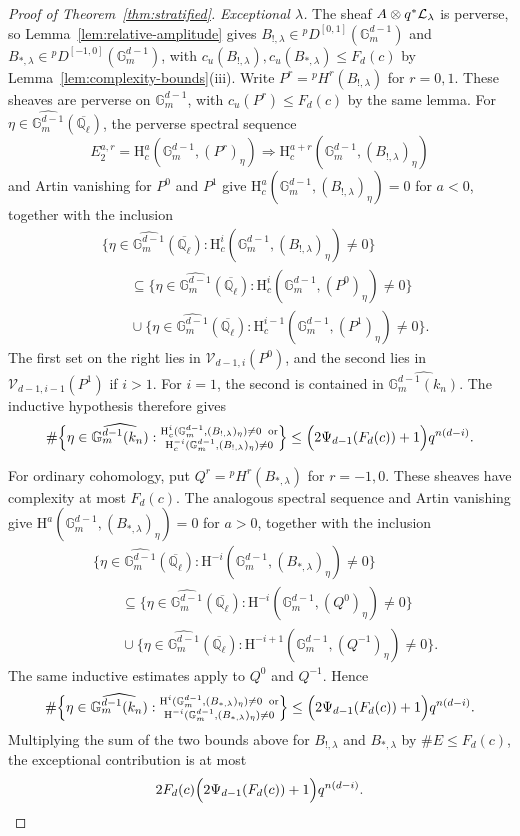 \documentclass[12pt,reqno]{amsart}
\theoremstyle{definition}
\theoremstyle{plain}
\theoremstyle{definition}
\theoremstyle{remark}
\newcommand{\bbG}{\mathbb{G}}  \newcommand{\bbH}{\mathbb{H}}
\newcommand{\bbQ}{\mathbb{Q}}  \newcommand{\bbR}{\mathbb{R}}
\newcommand{\HH}{\mathrm{H}}  \newcommand{\JJ}{\mathrm{J}}
\newcommand{\ol}[1]{\overline{#1}}
\newcommand{\Ql}{\bbQ_{\ell}}
\newcommand{\Gm}{\bbG_m}
\newcommand{\cu}{c_u}
\begin{document}
\begin{proof}[Proof of Theorem~\ref{thm:stratified}]
\emph{Exceptional \(\lambda\).}  The sheaf \(A\otimes q^*\mathcal{L}_\lambda\) is perverse, so
Lemma~\ref{lem:relative-amplitude} gives \(B_{!,\lambda}\in{}^pD^{[0,1]}(\Gm^{d-1})\) and
\(B_{*,\lambda}\in{}^pD^{[-1,0]}(\Gm^{d-1})\), with
\(\cu(B_{!,\lambda}),\cu(B_{*,\lambda})\le F_{d}(c)\) by Lemma~\ref{lem:complexity-bounds}(iii).  Write
\(P^r={}^pH^r(B_{!,\lambda})\) for \(r=0,1\).  These sheaves are perverse on \(\Gm^{d-1}\), with
\(\cu(P^r)\le F_{d}(c)\) by the same lemma.  For
\(\eta\in\widehat{\Gm^{d-1}}(\ol\Ql)\), the perverse spectral sequence
\[
 E_2^{a,r}=\HH^a_c(\Gm^{d-1},(P^r)_\eta)
 \Rightarrow\HH^{a+r}_c(\Gm^{d-1},(B_{!,\lambda})_\eta)
\]
and Artin vanishing for \(P^0\) and \(P^1\) give \(\HH^{a}_c(\Gm^{d-1},(B_{!,\lambda})_\eta)=0\) for
\(a<0\), together with the inclusion
\[
\begin{aligned}
 &\{\eta\in\widehat{\Gm^{d-1}}(\ol\Ql):
       \HH^{i}_c(\Gm^{d-1},(B_{!,\lambda})_\eta)\neq0\}\\
 &\qquad\subseteq
 \{\eta\in\widehat{\Gm^{d-1}}(\ol\Ql):\HH^{i}_c(\Gm^{d-1},(P^0)_\eta)\neq0\}\\
 &\qquad{}\cup
 \{\eta\in\widehat{\Gm^{d-1}}(\ol\Ql):\HH^{i-1}_c(\Gm^{d-1},(P^1)_\eta)\neq0\}.
\end{aligned}
\]
The first set on the right lies in
\(\mathcal V_{d-1,i}(P^0)\), and the second lies in \(\mathcal V_{d-1,i-1}(P^1)\) if \(i>1\).  For
\(i=1\), the second is contained in \(\widehat{\Gm^{d-1}(k_n)}\).  The inductive hypothesis therefore gives
\[
 \#\Bigl\{\eta\in\widehat{\Gm^{d-1}(k_n)}:
 \substack{\HH^i_c(\Gm^{d-1},(B_{!,\lambda})_\eta)\neq0\ \,\text{or}\\
           \HH^{-i}_c(\Gm^{d-1},(B_{!,\lambda})_\eta)\neq0}\Bigr\}
 \le\Bigl(2\Psi_{d-1}(F_{d}(c))+1\Bigr)q^{n(d-i)}.
\]

For ordinary cohomology, put \(Q^r={}^pH^r(B_{*,\lambda})\) for \(r=-1,0\).  These sheaves have complexity
at most \(F_{d}(c)\).  The analogous spectral sequence and Artin vanishing give
\(\HH^{a}(\Gm^{d-1},(B_{*,\lambda})_\eta)=0\) for \(a>0\), together with the inclusion
\[
\begin{aligned}
 &\{\eta\in\widehat{\Gm^{d-1}}(\ol\Ql):
       \HH^{-i}(\Gm^{d-1},(B_{*,\lambda})_\eta)\neq0\}\\
 &\qquad\subseteq
 \{\eta\in\widehat{\Gm^{d-1}}(\ol\Ql):\HH^{-i}(\Gm^{d-1},(Q^0)_\eta)\neq0\}\\
 &\qquad{}\cup
 \{\eta\in\widehat{\Gm^{d-1}}(\ol\Ql):\HH^{-i+1}(\Gm^{d-1},(Q^{-1})_\eta)\neq0\}.
\end{aligned}
\]
The same inductive estimates apply to \(Q^0\) and \(Q^{-1}\).  Hence
\[
 \#\Bigl\{\eta\in\widehat{\Gm^{d-1}(k_n)}:
 \substack{\HH^i(\Gm^{d-1},(B_{*,\lambda})_\eta)\neq0\ \,\text{or}\\
           \HH^{-i}(\Gm^{d-1},(B_{*,\lambda})_\eta)\neq0}\Bigr\}
 \le\Bigl(2\Psi_{d-1}(F_{d}(c))+1\Bigr)q^{n(d-i)}.
\]
Multiplying the sum of the two bounds above for \(B_{!,\lambda}\) and \(B_{*,\lambda}\) by
\(\#E\le F_{d}(c)\), the exceptional contribution is at most
\[
 2F_{d}(c)
 \Bigl(2\Psi_{d-1}(F_{d}(c))+1\Bigr)q^{n(d-i)}.
\]


\end{proof}
\end{document}
